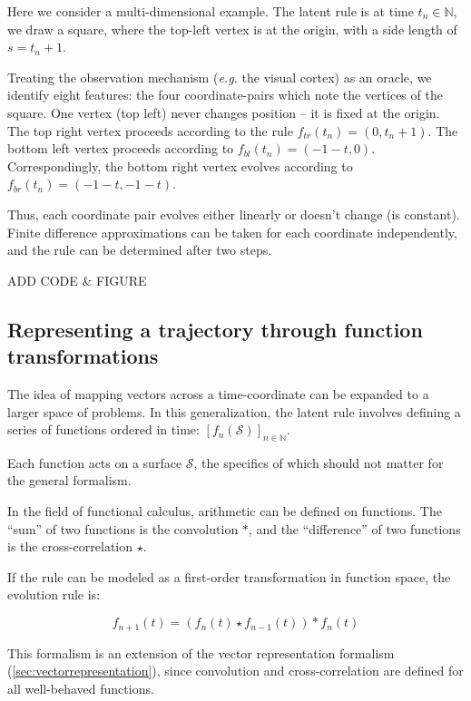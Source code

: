\documentclass{article}
\begin{document}
Here we consider a multi-dimensional example.
The latent rule is at time $t_n \in \mathbb{N}$, we draw a square,
where the top-left vertex is at the origin,
with a side length of $s = t_n + 1$.

Treating the observation mechanism (\textit{e.g.} the visual cortex) as an oracle,
we identify eight features: the four coordinate-pairs which note the vertices of the square.
One vertex (top left) never changes position -- it is fixed at the origin.
The top right vertex proceeds according to the rule $f_{tr}(t_n) = (0, t_n + 1)$.
The bottom left vertex proceeds according to $f_{bl}(t_n) = (-1 - t, 0)$.
Correspondingly, the bottom right vertex evolves according to $f_{br}(t_n) = (-1 -t, -1 -t)$.

Thus, each coordinate pair evolves either linearly or doesn't change (is constant).
Finite difference approximations can be taken for each coordinate independently,
and the rule can be determined after two steps.

ADD CODE \& FIGURE

\subsection{Representing a trajectory through function transformations}

The idea of mapping vectors across a time-coordinate can be expanded to a larger space of problems.
In this generalization, the latent rule involves defining a series of functions ordered in time:
$ \left[ f_n(\mathcal{S})\right]_{n \in \mathbb{N}}$.

Each function acts on a surface $\mathcal{S}$,
the specifics of which should not matter for the general formalism.

In the field of functional calculus, arithmetic can be defined on functions.
The ``sum'' of two functions is the convolution $*$, and the ``difference''
of two functions is the cross-correlation $\star$.

If the rule can be modeled as a first-order transformation in function space,
the evolution rule is:

\begin{equation}
  f_{n+1}(t) = (f_n(t) \star f_{n-1}(t)) * f_n(t)
\end{equation}

This formalism is an extension of the vector representation formalism (\ref{sec:vectorrepresentation}),
since convolution and cross-correlation are defined for all well-behaved functions.
\end{document}
